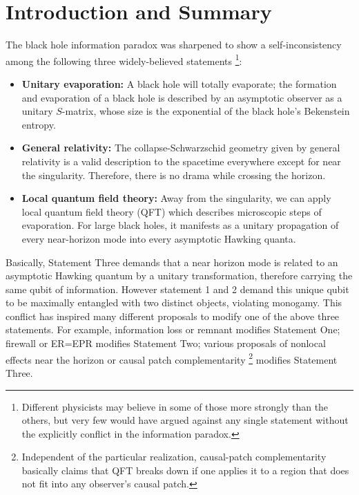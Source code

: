 \documentclass[aps,showpacs,twocolumn,floats,prd,superscriptaddress,nofootinbib]{revtex4-1}
\begin{document}
\maketitle


\onecolumngrid

\section{Introduction and Summary}

The black hole information paradox \cite{Haw76a} was sharpened to show a self-inconsistency among the following three widely-believed statements \cite{AMPS}
\footnote{Different physicists may believe in some of those more strongly than the others, but very few would have argued against any single statement without the explicitly conflict in the information paradox.}:
\begin{itemize}
\item {\bf Unitary evaporation:} A black hole will totally evaporate; the formation and evaporation of a black hole is described by an asymptotic observer as a unitary $S$-matrix, whose size is the exponential of the black hole's Bekenstein entropy.
\item {\bf General relativity:} The collapse-Schwarzschid geometry given by general relativity is a valid description to the spacetime everywhere except for near the singularity.
Therefore, there is no drama while crossing the horizon.
\item {\bf Local quantum field theory:} Away from the singularity, we can apply local quantum field theory (QFT) which describes microscopic steps of evaporation. 
For large black holes, it manifests as a unitary propagation of every near-horizon mode into every asymptotic Hawking quanta.
\end{itemize}
Basically, Statement Three demands that a near horizon mode is related to an asymptotic Hawking quantum by a unitary transformation, therefore carrying the same qubit of information. 
However statement 1 and 2 demand this unique qubit to be maximally entangled with two distinct objects, violating monogamy. 
This conflict has inspired many different proposals to modify one of the above three statements. 
For example, information loss or remnant \cite{Bek94} modifies Statement One; 
firewall \cite{BraPir09,AMPS} or ER=EPR \cite{MalSus13} modifies Statement Two;
various proposals of nonlocal effects near the horizon \cite{Gid12,DodSil15,OsuPag16} or causal patch complementarity \cite{HuiYan13,IlgYan13,LowTho14}
\footnote{Independent of the particular realization, causal-patch complementarity basically claims that QFT breaks down if one applies it to a region that does not fit into any observer's causal patch.} 
modifies Statement Three.
\end{document}
